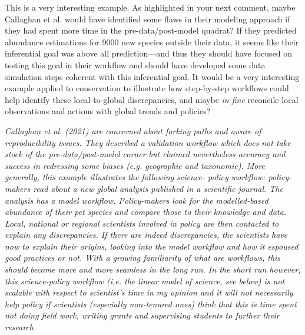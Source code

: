 \documentclass[11pt,letter]{article}
\begin{document}
This is a very interesting example. As highlighted in your next comment, maybe Callaghan et al. would have identified some flaws in their modeling approach if they had spent more time in the pre-data/post-model quadrat? If they predicted abundance estimations for 9000 new species outside their data, it seems like their inferential goal was above all prediction---and thus they should have focused on testing this goal in their workflow and should have developed some data simulation steps coherent with this inferential goal. It would be a very interesting example applied to conservation to illustrate how step-by-step workflows could help identify these local-to-global discrepancies, and maybe \emph{in fine} reconcile local observations and actions with global trends and policies?

\begin{mybox}
\emph{Callaghan et al. (2021) are concerned about forking paths and aware of reproducibility issues.
They described a validation workflow which does not take stock of the pre-data/post-model
corner but claimed nevertheless accuracy and success in redressing some biases (e.g.
geographic and taxonomic). More generally, this example illustrates the following science-
policy workflow: policy-makers read about a new global analysis published in a scientific
journal. The analysis has a model workflow. Policy-makers look for the modelled-based
abundance of their pet species and compare those to their knowledge and data. Local, national
or regional scientists involved in policy are then contacted to explain any discrepancies. If
there are indeed discrepancies, the scientists have now to explain their origins, looking into the
model workflow and how it espoused good practices or not. With a growing familiarity of
what are workflows, this should become more and more seamless in the long run. In the short
run however, this science-policy workflow (i.e. the linear model of science, see below) is not
scalable with respect to scientist’s time in my opinion and it will not necessarily help policy if
scientists (especially non-tenured ones) think that this is time spent not doing field work,
writing grants and supervising students to further their research.}  
\end{mybox}
\end{document}
